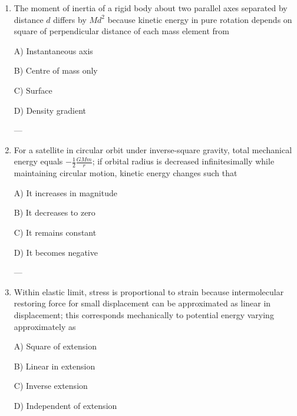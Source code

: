 \documentclass[12pt]{article}
\begin{document}
\begin{enumerate}[leftmargin=*]
A) Exact cancellation by symmetry  

B) Radial enhancement  

C) Tangential dominance  

D) Divergent integral  

---

\item The moment of inertia of a rigid body about two parallel axes separated by distance \(d\) differs by \(Md^2\) because kinetic energy in pure rotation depends on square of perpendicular distance of each mass element from  

A) Instantaneous axis  

B) Centre of mass only  

C) Surface  

D) Density gradient  

---

\item For a satellite in circular orbit under inverse-square gravity, total mechanical energy equals \(-\frac{1}{2}\frac{GMm}{r}\); if orbital radius is decreased infinitesimally while maintaining circular motion, kinetic energy changes such that  

A) It increases in magnitude  

B) It decreases to zero  

C) It remains constant  

D) It becomes negative  

---

\item Within elastic limit, stress is proportional to strain because intermolecular restoring force for small displacement can be approximated as linear in displacement; this corresponds mechanically to potential energy varying approximately as  

A) Square of extension  

B) Linear in extension  

C) Inverse extension  

D) Independent of extension  

\end{enumerate}
\end{document}
